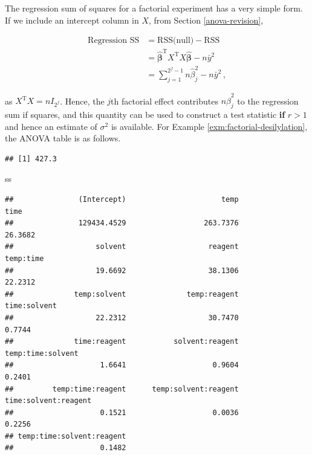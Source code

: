 \documentclass[
]{book}
\newenvironment{Shaded}{\begin{snugshade}}{\end{snugshade}}
\newcommand{\DecValTok}[1]{\textcolor[rgb]{0.00,0.00,0.81}{#1}}
\newcommand{\FunctionTok}[1]{\textcolor[rgb]{0.00,0.00,0.00}{#1}}
\newcommand{\NormalTok}[1]{#1}
\newcommand{\OtherTok}[1]{\textcolor[rgb]{0.56,0.35,0.01}{#1}}
\newcommand{\SpecialCharTok}[1]{\textcolor[rgb]{0.00,0.00,0.00}{#1}}
\theoremstyle{definition}
\theoremstyle{definition}
\theoremstyle{definition}
\theoremstyle{definition}
\theoremstyle{remark}
\begin{document}
The regression sum of squares for a factorial experiment has a very simple form. If we include an intercept column in \(X\), from Section \ref{anova-revision},

\begin{align*}
\mbox{Regression SS} & = \mbox{RSS(null)} - \mbox{RSS} \\
& = \hat{\boldsymbol{\beta}}^{\mathrm{T}}X^{\mathrm{T}}X\hat{\boldsymbol{\beta}} - n\bar{y}^2 \\
& = \sum_{j=1}^{2^f-1}n\hat{\beta}_j^2 - n\bar{y}^2\,,
\end{align*}

as \(X^{\mathrm{T}}X = nI_{2^f}\). Hence, the \(j\)th factorial effect contributes \(n\hat{\beta}_j^2\) to the regression sum if squares, and this quantity can be used to construct a test statistic \textbf{if} \(r>1\) and hence an estimate of \(\sigma^2\) is available. For Example \ref{exm:factorial-desilylation}, the ANOVA table is as follows.

\begin{Shaded}
\end{Shaded}

\begin{verbatim}
## [1] 427.3
\end{verbatim}

\begin{Shaded}
\begin{Highlighting}[]
\NormalTok{ss}
\end{Highlighting}
\end{Shaded}

\begin{verbatim}
##               (Intercept)                      temp                      time 
##               129434.4529                  263.7376                   26.3682 
##                   solvent                   reagent                 temp:time 
##                   19.6692                   38.1306                   22.2312 
##              temp:solvent              temp:reagent              time:solvent 
##                   22.2312                   30.7470                    0.7744 
##              time:reagent           solvent:reagent         temp:time:solvent 
##                    1.6641                    0.9604                    0.2401 
##         temp:time:reagent      temp:solvent:reagent      time:solvent:reagent 
##                    0.1521                    0.0036                    0.2256 
## temp:time:solvent:reagent 
##                    0.1482
\end{verbatim}
\end{document}
